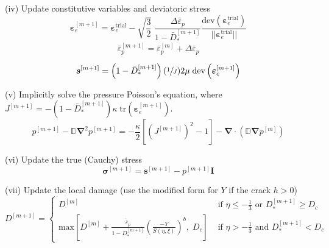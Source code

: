 \documentclass[sn-mathphys,Numbered,draft]{sn-jnl}%
\newcommand{\bb}{\boldsymbol}
\begin{document}
\begin{algorithm}[htbp]
(iv) Update constitutive variables and deviatoric stress
\begin{equation}
	\boldsymbol{\varepsilon}_{e}^{[m+1]}
	=
	\boldsymbol{\varepsilon}_{e}^{\text{trial}}
	- \sqrt{\frac{3}{2}} \; \frac{ \Delta\bar{\varepsilon}_p}{1 - \bar{D}^{[m+1]}_*}
	\frac{\text{dev}(\boldsymbol{\varepsilon}_{e}^{\text{trial}})}{||\boldsymbol{\varepsilon}_{e}^{\text{trial}}||}
	\nonumber
\end{equation}
\begin{equation}
	\bar{\varepsilon}_p^{[m+1]} = \bar{\varepsilon}_p^{[m]} + \Delta\bar{\varepsilon}_p \nonumber
\end{equation}

\begin{equation}
	\boldsymbol{s}^{[m+1]}
	=
	\left(1 - \bar{D}^{[m+1]}_*\right) (\sfrac{1}{J}) 2\mu \;\text{dev}\left(\boldsymbol{\varepsilon}_{e}^{[m+1]}\right) \nonumber
\end{equation}

(v) Implicitly solve the pressure Poisson's equation, where $J^{[m+1]} = -(1 - \bar{D}^{[m+1]}_*) \kappa \; \text{tr}\left(\boldsymbol{\varepsilon}_{e}^{[m+1]}\right)$.
\begin{equation}
	p^{[m+1]} - \mathbb{D} \bb{\nabla}^2 p^{[m+1]} = -\frac{\kappa}{2} \left[\left(J^{[m+1]}\right)^{2} - 1\right] - \bb{\nabla} \cdot \left( \mathbb{D} \bb{\nabla} p^{[m]} \right)
\end{equation}


(vi) Update the true (Cauchy) stress
\begin{equation}
	\boldsymbol{\sigma}^{[m+1]} = \boldsymbol{s}^{[m+1]} -  p^{[m+1]}\textbf{I} \nonumber
\end{equation}

(vii) Update the local damage (use the modified form for $Y$ if the crack $h > 0$)
\begin{equation} %
	D^{[m+1]} =
	\begin{cases}
		D^{[m]} & \text { if } \eta \leq -\frac{1}{3} \text{ or } D^{[m+1]}_* \geq D_c \\
		\text{max} \left[ D^{[m]} + \frac{\dot{\bar{\varepsilon}}_p}{1 - D^{[m+1]}_*}\left(\frac{-Y}{S(\eta,\xi)}\right)^b, \; D_c \right]
		& \text { if } \eta>-\frac{1}{3} \text{ and }  D^{[m+1]}_* < D_c
	\end{cases}
\end{equation}



\end{algorithm}
\end{document}
